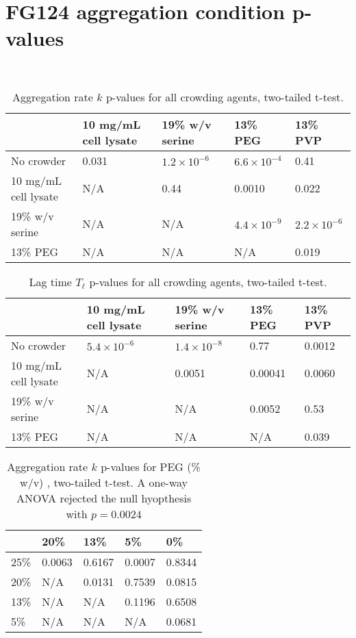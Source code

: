 \chapter{FG124 aggregation condition p-values}~\label{appx:p-values}

\begin{table}[b!]
  \caption[Aggregation rate p-values for all crowding agents.]{Aggregation rate $k$ p-values for all crowding agents, two-tailed t-test.}
    \label{table:p-k-values-all}
    \begin{tabular}{p{4cm}|p{3.5cm}p{3cm}p{2cm}p{2cm}}
        &10 mg/mL cell lysate &  19\% w/v serine & 13\% PEG & 13\% PVP\\
      \hline
	No crowder   & 0.031 & $1.2 \times 10^{-6}$ & $6.6\times 10^{-4}$ &0.41\\
	10 mg/mL cell lysate   & N/A & 0.44 & 0.0010 &  0.022\\
     	19\% w/v serine & N/A  & N/A & $4.4\times 10^{-9}$ & $2.2\times 10^{-6}$\\
      	13\% PEG    & N/A & N/A  & N/A & 0.019\\
    \end{tabular}
\end{table}

\begin{table}[b!]
  \caption[Lag time p-values for all crowding agents.]{Lag time $T_\ell$ p-values for all crowding agents, two-tailed t-test.}
    \label{table:p-tl-values-all}
    \begin{tabular}{p{4cm}|p{3.5cm}p{3cm}p{2cm}p{2cm}}
        &10 mg/mL cell lysate &  19\% w/v serine & 13\% PEG & 13\% PVP\\
      \hline
	No crowder   & $5.4 \times 10^{-6}$ & $1.4 \times 10^{-8}$ & 0.77 &0.0012\\
	10 mg/mL cell lysate   & N/A & 0.0051 & 0.00041 &  0.0060\\
     	19\% w/v serine & N/A  & N/A & 0.0052 & 0.53\\
      	13\% PEG    & N/A & N/A  & N/A & 0.039\\
    \end{tabular}
\end{table}

\begin{table}[b!]
  \caption[Aggregation rate p-values for PEG.]{Aggregation rate $k$ p-values for PEG (\% w/v) , two-tailed t-test. A one-way ANOVA rejected the null hyopthesis with $p=0.0024$} 
    \label{table:p-k-values-peg}
    \begin{tabular}{p{2cm}|p{3cm}p{3cm}p{3cm}p{3cm}}
        &20\% &  13\% & 5\% & 0\% \\ \hline
	25\% & 0.0063 & 0.6167 & 0.0007 &0.8344\\
	20\% & N/A &0.0131 & 0.7539 & 0.0815\\
     	13\% & N/A  & N/A & 0.1196 & 0.6508\\
      	5\% & N/A & N/A  & N/A & 0.0681\\
    \end{tabular}
\end{table}


